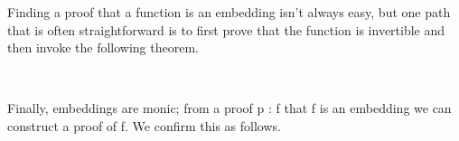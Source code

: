Finding a proof that a function is an embedding isn't always easy, but one path that is often straightforward is to first prove that the function is invertible and then invoke the following theorem.
\ccpad
\begin{code}%
\>[1]\AgdaSpace{}%
\AgdaSymbol{:}\AgdaSpace{}%
\AgdaSymbol{(}\AgdaSpace{}%
\AgdaSymbol{:}\AgdaSpace{}%
\AgdaSpace{}%
\AgdaSpace{}%
\AgdaSymbol{)}\AgdaSpace{}%
\AgdaSpace{}%
\AgdaSpace{}%
\AgdaSpace{}%
\AgdaSpace{}%
\AgdaSpace{}%
\<%
\\
%
\>[1]\AgdaSpace{}%
\AgdaSpace{}%
\AgdaSpace{}%
\AgdaSymbol{=}\AgdaSpace{}%
\AgdaSpace{}%
\AgdaSpace{}%
\AgdaSymbol{(}\AgdaSpace{}%
\AgdaSpace{}%
\AgdaSymbol{)}\<%
\end{code}
\ccpad
Finally, embeddings are monic; from a proof \ab p \as :  \ab f that \ab f is an embedding we can construct a proof of  \ab f. We confirm this as follows.
\ccpad
